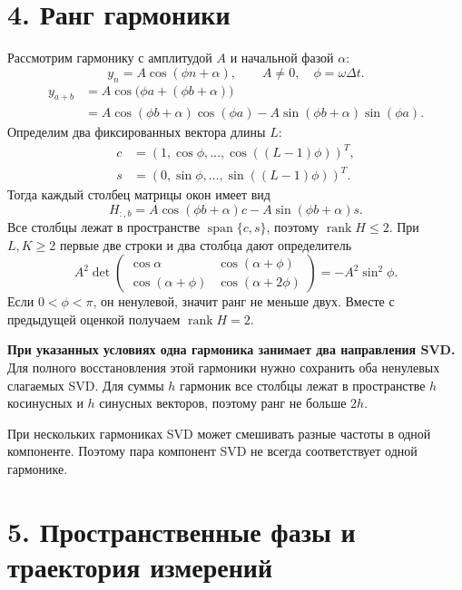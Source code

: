 \documentclass[11pt,a4paper]{article}
\begin{document}
\section*{4. Ранг гармоники}
Рассмотрим гармонику с амплитудой $A$ и начальной фазой $\alpha$:
\[
 y_n=A\cos(\phi n+\alpha),\qquad A\ne0,\quad \phi=\omega\Delta t.
\]
\begin{align*}
 y_{a+b}
 &=A\cos\bigl(\phi a+(\phi b+\alpha)\bigr)\\
 &=A\cos(\phi b+\alpha)\cos(\phi a)
   -A\sin(\phi b+\alpha)\sin(\phi a).
\end{align*}
Определим два фиксированных вектора длины $L$:
\begin{align*}
 c&=(1,\cos\phi,\ldots,\cos((L-1)\phi))^T,\\
 s&=(0,\sin\phi,\ldots,\sin((L-1)\phi))^T.
\end{align*}
Тогда каждый столбец матрицы окон имеет вид
\[
 H_{:,b}=A\cos(\phi b+\alpha)c-A\sin(\phi b+\alpha)s.
\]
Все столбцы лежат в пространстве $\operatorname{span}\{c,s\}$,
поэтому $\operatorname{rank}H\leq2$.
При $L,K\geq2$ первые две строки и два столбца дают определитель
\[
 A^2\det\begin{pmatrix}
 \cos\alpha&\cos(\alpha+\phi)\\
 \cos(\alpha+\phi)&\cos(\alpha+2\phi)
 \end{pmatrix}=-A^2\sin^2\phi.
\]
Если $0<\phi<\pi$, он ненулевой, значит ранг не меньше двух.
Вместе с предыдущей оценкой получаем $\operatorname{rank}H=2$.

\textbf{При указанных условиях одна гармоника занимает два направления SVD.}
Для полного восстановления этой гармоники нужно сохранить
оба ненулевых слагаемых SVD.
Для суммы $h$ гармоник все столбцы лежат в пространстве $h$ косинусных
и $h$ синусных векторов, поэтому ранг не больше $2h$.

При нескольких гармониках SVD может смешивать разные частоты в одной
компоненте. Поэтому пара компонент SVD не всегда соответствует
одной гармонике.

\section*{5. Пространственные фазы и траектория измерений}
\end{document}
